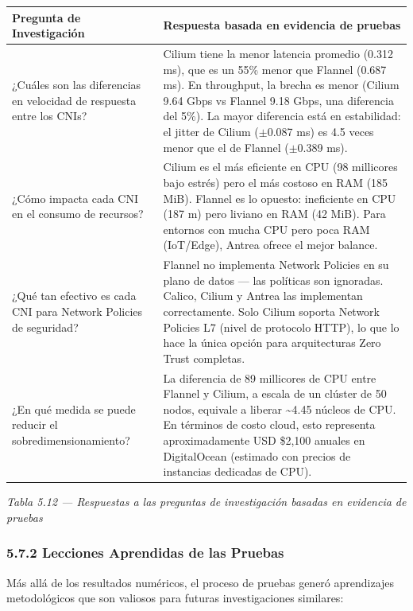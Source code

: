 \documentclass[journal]{IEEEtran}
\begin{document}
\begin{table}[htbp]
\centering
\scriptsize
\begin{tabularx}{\textwidth}{|Y|Y|}
\hline
\textbf{Pregunta de Investigación} & \textbf{Respuesta basada en evidencia de pruebas} \\
\hline
¿Cuáles son las diferencias en velocidad de respuesta entre los CNIs? & Cilium tiene la menor latencia promedio (0.312 ms), que es un 55\% menor que Flannel (0.687 ms). En throughput, la brecha es menor (Cilium 9.64 Gbps vs Flannel 9.18 Gbps, una diferencia del 5\%). La mayor diferencia está en estabilidad: el jitter de Cilium ($\pm$0.087 ms) es 4.5 veces menor que el de Flannel ($\pm$0.389 ms). \\
¿Cómo impacta cada CNI en el consumo de recursos? & Cilium es el más eficiente en CPU (98 millicores bajo estrés) pero el más costoso en RAM (185 MiB). Flannel es lo opuesto: ineficiente en CPU (187 m) pero liviano en RAM (42 MiB). Para entornos con mucha CPU pero poca RAM (IoT/Edge), Antrea ofrece el mejor balance. \\
¿Qué tan efectivo es cada CNI para Network Policies de seguridad? & Flannel no implementa Network Policies en su plano de datos --- las políticas son ignoradas. Calico, Cilium y Antrea las implementan correctamente. Solo Cilium soporta Network Policies L7 (nivel de protocolo HTTP), lo que lo hace la única opción para arquitecturas Zero Trust completas. \\
¿En qué medida se puede reducir el sobredimensionamiento? & La diferencia de 89 millicores de CPU entre Flannel y Cilium, a escala de un clúster de 50 nodos, equivale a liberar \textasciitilde{}4.45 núcleos de CPU. En términos de costo cloud, esto representa aproximadamente USD \$2,100 anuales en DigitalOcean (estimado con precios de instancias dedicadas de CPU). \\
\hline
\end{tabularx}
\end{table}

\begin{center}\emph{\emph{Tabla 5.12 --- Respuestas a las preguntas de investigación basadas en evidencia de pruebas}}\end{center}

\subsubsection{5.7.2 Lecciones Aprendidas de las Pruebas}

Más allá de los resultados numéricos, el proceso de pruebas generó aprendizajes metodológicos que son valiosos para futuras investigaciones similares:
\end{document}
